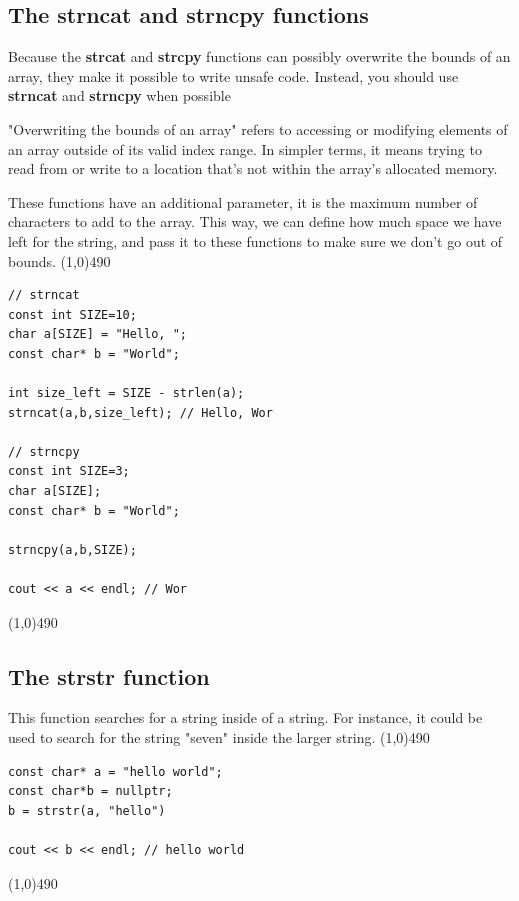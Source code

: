 \documentclass{report}
\begin{document}
    \subsection{The strncat and strncpy functions}
    \bigbreak \noindent 
    Because the \textbf{strcat} and \textbf{strcpy} functions can possibly overwrite the bounds of an array, they make it possible to write unsafe code. Instead, you should use \textbf{strncat} and \textbf{strncpy} when possible
    \bigbreak \noindent 
    \begin{remark}
       "Overwriting the bounds of an array" refers to accessing or modifying elements of an array outside of its valid index range. In simpler terms, it means trying to read from or write to a location that's not within the array's allocated memory.
    \end{remark}
    \bigbreak \noindent 
    These functions have an additional parameter, it is the maximum number of characters to add to the array. This way, we can define how much space we have left for the string, and pass it to these functions to make sure we don't go out of bounds.
    \bigbreak \noindent 
    \line(1,0){490}
    \begin{verbatim}
// strncat
const int SIZE=10;
char a[SIZE] = "Hello, ";
const char* b = "World";

int size_left = SIZE - strlen(a);
strncat(a,b,size_left); // Hello, Wor

// strncpy
const int SIZE=3;
char a[SIZE];
const char* b = "World";

strncpy(a,b,SIZE);

cout << a << endl; // Wor
    \end{verbatim}
    \line(1,0){490}

    \bigbreak \noindent 
    \subsection{The strstr function}
    \bigbreak \noindent 
    This function searches for a string inside of a string. For instance, it could be used to search for the string "seven" inside the larger string.
    \bigbreak \noindent 
    \line(1,0){490}
    \begin{verbatim}
const char* a = "hello world";
const char*b = nullptr;
b = strstr(a, "hello")

cout << b << endl; // hello world
    \end{verbatim}
    \line(1,0){490}
    \bigbreak \noindent 
    \bigbreak \noindent 
\end{document}
